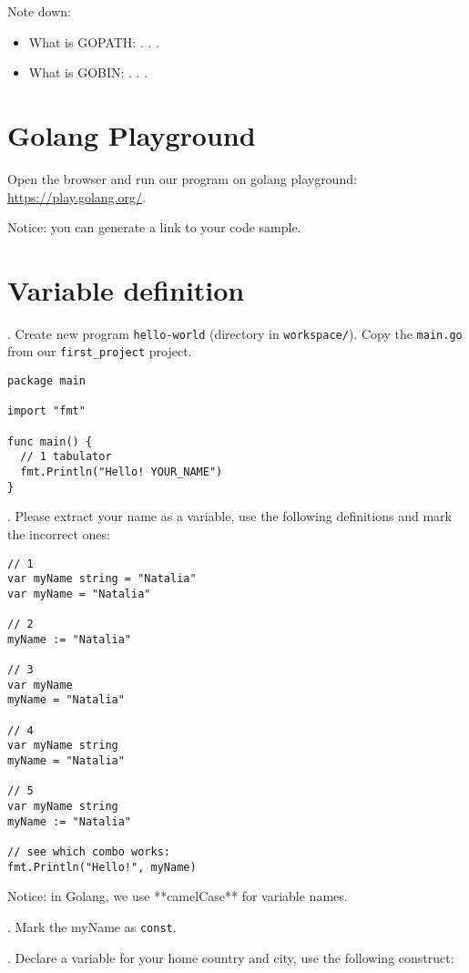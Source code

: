 \documentclass[11pt, letterpaper]{article}
\begin{document}
\bigskip
Note down:
\begin{itemize}
    \item What is GOPATH: . . .
    \item What is GOBIN: . . .
\end{itemize}

\section{Golang Playground}

Open the browser and run our program on golang playground: \href{https://play.golang.org/}{https://play.golang.org/}.

Notice: you can generate a link to your code sample.

\section{Variable definition}
. Create new program \verb|hello-world| (directory in \texttt{workspace/}). Copy the \verb|main.go| from our \verb|first_project| project.

\begin{verbatim}
package main

import "fmt"

func main() {
  // 1 tabulator
  fmt.Println("Hello! YOUR_NAME")
}
\end{verbatim}

. Please extract your name as a variable, use the following definitions and mark the incorrect ones:

\begin{verbatim}
// 1
var myName string = "Natalia"
var myName = "Natalia"

// 2
myName := "Natalia"

// 3
var myName
myName = "Natalia"

// 4
var myName string
myName = "Natalia"

// 5
var myName string
myName := "Natalia"

// see which combo works:
fmt.Println("Hello!", myName)
\end{verbatim}

Notice: in Golang, we use **camelCase** for variable names.

. Mark the myName as \verb|const|.

. Declare a variable for your home country and city, use the following construct:
\end{document}
